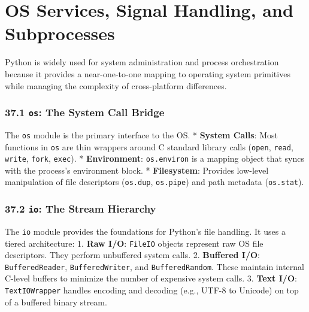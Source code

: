 \hypertarget{os-services-signal-handling-and-subprocesses}{%
\chapter{OS Services, Signal Handling, and
Subprocesses}\label{os-services-signal-handling-and-subprocesses}}

Python is widely used for system administration and process
orchestration because it provides a near-one-to-one mapping to operating
system primitives while managing the complexity of cross-platform
differences.

\hypertarget{os-the-system-call-bridge}{%
\subsection{\texorpdfstring{37.1 \texttt{os}: The System Call
Bridge}{37.1 os: The System Call Bridge}}\label{os-the-system-call-bridge}}

The \passthrough{\lstinline!os!} module is the primary interface to the
OS. * \textbf{System Calls}: Most functions in
\passthrough{\lstinline!os!} are thin wrappers around C standard library
calls (\passthrough{\lstinline!open!}, \passthrough{\lstinline!read!},
\passthrough{\lstinline!write!}, \passthrough{\lstinline!fork!},
\passthrough{\lstinline!exec!}). * \textbf{Environment}:
\passthrough{\lstinline!os.environ!} is a mapping object that syncs with
the process's environment block. * \textbf{Filesystem}: Provides
low-level manipulation of file descriptors
(\passthrough{\lstinline!os.dup!}, \passthrough{\lstinline!os.pipe!})
and path metadata (\passthrough{\lstinline!os.stat!}).

\hypertarget{io-the-stream-hierarchy}{%
\subsection{\texorpdfstring{37.2 \texttt{io}: The Stream
Hierarchy}{37.2 io: The Stream Hierarchy}}\label{io-the-stream-hierarchy}}

The \passthrough{\lstinline!io!} module provides the foundations for
Python's file handling. It uses a tiered architecture: 1. \textbf{Raw
I/O}: \passthrough{\lstinline!FileIO!} objects represent raw OS file
descriptors. They perform unbuffered system calls. 2. \textbf{Buffered
I/O}: \passthrough{\lstinline!BufferedReader!},
\passthrough{\lstinline!BufferedWriter!}, and
\passthrough{\lstinline!BufferedRandom!}. These maintain internal
C-level buffers to minimize the number of expensive system calls. 3.
\textbf{Text I/O}: \passthrough{\lstinline!TextIOWrapper!} handles
encoding and decoding (e.g., UTF-8 to Unicode) on top of a buffered
binary stream.

